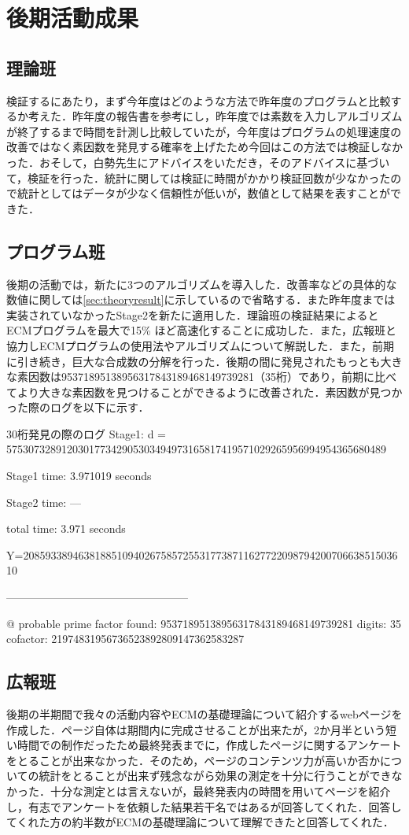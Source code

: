 \documentclass[openany,11pt,papersize]{jsbook}
\begin{document}
\chapter{後期活動成果}

\section{理論班}
検証するにあたり，まず今年度はどのような方法で昨年度のプログラムと比較するか考えた．昨年度の報告書を参考にし，昨年度では素数を入力しアルゴリズムが終了するまで時間を計測し比較していたが，今年度はプログラムの処理速度の改善ではなく素因数を発見する確率を上げたため今回はこの方法では検証しなかった．おそして，白勢先生にアドバイスをいただき，そのアドバイスに基づいて，検証を行った．統計に関しては検証に時間がかかり検証回数が少なかったので統計としてはデータが少なく信頼性が低いが，数値として結果を表すことができた．

\section{プログラム班}
後期の活動では，新たに3つのアルゴリズムを導入した．改善率などの具体的な数値に関しては\ref{sec:theoryresult}に示しているので省略する．また昨年度までは実装されていなかったStage2を新たに適用した．理論班の検証結果によるとECMプログラムを最大で15\% ほど高速化することに成功した．また，広報班と協力しECMプログラムの使用法やアルゴリズムについて解説した．また，前期に引き続き，巨大な合成数の分解を行った．後期の間に発見されたもっとも大きな素因数は95371895138956317843189468149739281（35桁）であり，前期に比べてより大きな素因数を見つけることができるように改善された．素因数が見つかった際のログを以下に示す．
\begin{itembox}[H]{30桁発見の際のログ}
Stage1: d = 575307328912030177342905303494973165817419571029265956994954365680489

Stage1 time: 3.971019 seconds

Stage2 time: ---

total time: 3.971 seconds

Y=2085933894638188510940267585725531773871162772209879420070663851503610

--------------------------------------------------

@ probable prime factor found: 95371895138956317843189468149739281  digits: 35 cofactor: 21974831956736523892809147362583287
\end{itembox}

\section{広報班}
後期の半期間で我々の活動内容やECMの基礎理論について紹介するwebページを作成した．ページ自体は期間内に完成させることが出来たが，2か月半という短い時間での制作だったため最終発表までに，作成したページに関するアンケートをとることが出来なかった．そのため，ページのコンテンツ力が高いか否かについての統計をとることが出来ず残念ながら効果の測定を十分に行うことができなかった．十分な測定とは言えないが，最終発表内の時間を用いてページを紹介し，有志でアンケートを依頼した結果若干名ではあるが回答してくれた．回答してくれた方の約半数がECMの基礎理論について理解できたと回答してくれた．

\end{document}
